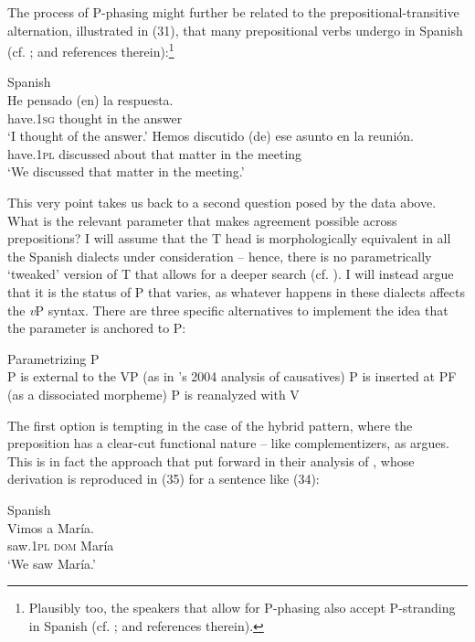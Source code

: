 \documentclass[output=paper]{langsci/langscibook}
\begin{document}
The process of P-phasing might further be related to the prepositional-transitive alternation, illustrated in (31), that many prepositional verbs undergo in Spanish (cf. \citealt{Demonte1991,García-Miguel1995,Gallego2010}; and references therein):\footnote{Plausibly too, the speakers that allow for P-phasing also accept P-stranding in Spanish (cf. \citealt{Depiante2013,Lemos2013}; and references therein).}

\ea%
    Spanish\label{ex:gallego:32}\\
    \ea
    \gll He             pensado (en) la     respuesta.        \\
         have{}.\textsc{1sg}  thought    in   the   answer\\
    \glt ‘I thought of the answer.’
    \ex
    \gll Hemos      discutido  (de)     ese  asunto  en  la   reunión.  \\
         have{}.\textsc{1pl}  discussed  about  that  matter  in  the meeting\\
    \glt ‘We discussed that matter in the meeting.’
    \z
\z

This very point takes us back to a second question posed by the data above. What is the relevant parameter that makes agreement possible across prepositions? I will assume that the T head is morphologically equivalent in all the Spanish dialects under consideration – hence, there is no parametrically ‘tweaked’ version of T that allows for a deeper search (cf. \citealt{Chomsky2001Derivation}). I will instead argue that it is the status of P that varies, as whatever happens in these dialects affects the \textit{v}P syntax. There are three specific alternatives to implement the idea that the parameter is anchored to P:

\ea%
    Parametrizing P\label{ex:gallego:33}\\
    \ea P is external to the VP (as in \citeauthor{Kayne2004}'s 2004 analysis of causatives)
    \ex P is inserted at PF (as a dissociated morpheme)
    \ex P is reanalyzed with V
\z
\z

The first option is tempting in the case of the hybrid pattern, where the preposition has a clear-cut functional nature – like complementizers, as \citet{Kayne2004} argues. This is in fact the approach that \citet{Ordóñez2016} put forward in their analysis of \DOM, whose derivation is reproduced in (35) for a sentence like (34):

\ea%
    Spanish\label{ex:gallego:34}\\
    \gll   Vimos     a          María.\\
           saw{}.\textsc{1pl}  \textsc{dom}   María\\
    \glt   ‘We saw María.’
\z
  
\end{document}
